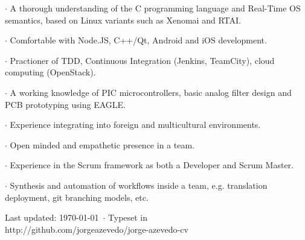 {
 $\cdot$ A thorough understanding of the C programming language and Real-Time OS
semantics, based on Linux variants such as Xenomai and RTAI.

 $\cdot$ Comfortable with Node.JS, C++/Qt, Android and iOS development.

 $\cdot$ Practioner of TDD, Continuous Integration (Jenkins, TeamCity), cloud
computing (OpenStack).
}
{
 $\cdot$ A working knowledge of PIC microcontrollers, basic analog filter design and PCB
prototyping using EAGLE.
}
{
 $\cdot$ Experience integrating into foreign and multicultural environments.

 $\cdot$ Open minded and empathetic presence in a team.
}
{

 $\cdot$ Experience in the Scrum framework as both a Developer and Scrum
Master.

 $\cdot$ Synthesis and automation of workflows inside a team, e.g.
translation deployment, git branching models, etc.
}


\vfill

\begin{center}
{
    \scriptsize  Last updated: \today ~$\cdot$ Typeset in \XeLaTeX\\
    http://github.com/jorgeazevedo/jorge-azevedo-cv
}

\end{center}

